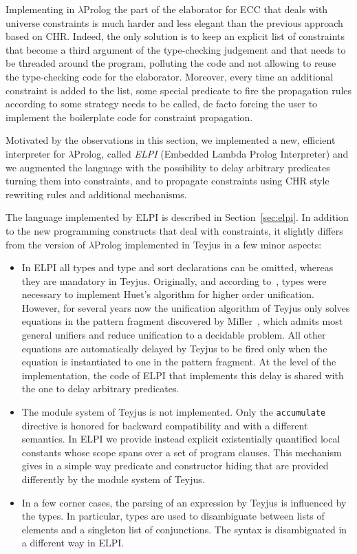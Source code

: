 \documentclass{easychair}
\begin{document}
Implementing in $\lambda$Prolog the part of the elaborator for ECC that deals with universe constraints is much harder and less elegant than the previous approach based on CHR. Indeed, the only solution is to keep an explicit list of constraints that become a third argument of the type-checking judgement and that needs to be threaded around the program, polluting the code and not allowing to reuse the type-checking code for the elaborator. Moreover, every time an additional constraint is added to the list, some special predicate to fire the propagation rules according to some strategy needs to be called, de facto forcing the user to implement the boilerplate code for constraint propagation.

Motivated by the observations in this section, we implemented a new, efficient~\cite{???} interpreter for $\lambda$Prolog, called \emph{ELPI} (Embedded Lambda Prolog Interpreter) and we augmented the language with the possibility to delay arbitrary predicates turning them into constraints, and to propagate constraints using CHR style rewriting rules and additional mechanisms.

The language implemented by ELPI is described in Section~\ref{sec:elpi}.
In addition to the new programming constructs that deal with constraints, it slightly differs from the version of $\lambda$Prolog implemented in Teyjus in a few minor aspects:
\begin{itemize}
\item In ELPI all types and type and sort declarations can be omitted, whereas they are mandatory in Teyjus. Originally, and according to~\cite{jlp98}, types were necessary to implement Huet's algorithm for higher order unification. However, for several years now the unification algorithm of Teyjus only solves equations in the pattern fragment discovered by Miller~\cite{patternfrag}, which admits most general unifiers and reduce unification to a decidable problem. All other equations are automatically delayed by Teyjus to be fired only when the equation is instantiated to one in the pattern fragment. At the level of the implementation, the code of ELPI that implements this delay is shared with the one to delay arbitrary predicates.
\item The module system of Teyjus is not implemented. Only the \verb+accumulate+ directive is honored for backward compatibility and with a different semantics. In ELPI we provide instead explicit existentially quantified local constants whose scope spans over a set of program clauses. This mechanism gives in a simple way predicate and constructor hiding that are provided differently by the module system of Teyjus.
\item In a few corner cases, the parsing of an expression by Teyjus is influenced by the types. In particular, types are used to disambiguate between lists of elements and a singleton list of conjunctions. The syntax is disambiguated in a different way in ELPI.
\end{itemize}
\end{document}
